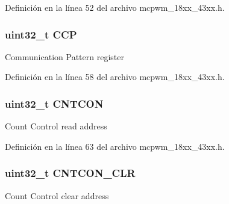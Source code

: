 Definición en la línea 52 del archivo mcpwm\+\_\+18xx\+\_\+43xx.\+h.

\subsubsection[{\texorpdfstring{C\+CP}{CCP}}]{ uint32\+\_\+t C\+CP}\hypertarget{struct_l_p_c___m_c_p_w_m___t_abea07361ea938debec4d4350d3386796}{}\label{struct_l_p_c___m_c_p_w_m___t_abea07361ea938debec4d4350d3386796}
Communication Pattern register 

Definición en la línea 58 del archivo mcpwm\+\_\+18xx\+\_\+43xx.\+h.

\subsubsection[{\texorpdfstring{C\+N\+T\+C\+ON}{CNTCON}}]{ uint32\+\_\+t C\+N\+T\+C\+ON}\hypertarget{struct_l_p_c___m_c_p_w_m___t_a6784dbad894db197b690d5819cb51fb6}{}\label{struct_l_p_c___m_c_p_w_m___t_a6784dbad894db197b690d5819cb51fb6}
Count Control read address 

Definición en la línea 63 del archivo mcpwm\+\_\+18xx\+\_\+43xx.\+h.

\subsubsection[{\texorpdfstring{C\+N\+T\+C\+O\+N\+\_\+\+C\+LR}{CNTCON_CLR}}]{ uint32\+\_\+t C\+N\+T\+C\+O\+N\+\_\+\+C\+LR}\hypertarget{struct_l_p_c___m_c_p_w_m___t_a2fae334c43937b3105b3aead47f8d95f}{}\label{struct_l_p_c___m_c_p_w_m___t_a2fae334c43937b3105b3aead47f8d95f}
Count Control clear address 

